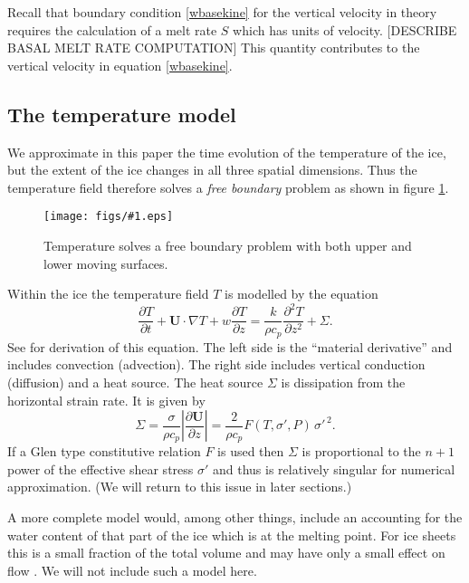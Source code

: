 \documentclass[12pt,final]{amsart}%
\theoremstyle{plain}
\theoremstyle{definition}
\theoremstyle{remark}
\newcommand{\regfigure}[2]{\texttt{[image: figs/\#1.eps]}}
\newcommand{\ddt}[1]{\ensuremath{\frac{\partial #1}{\partial t}}}
\newcommand{\ddz}[1]{\ensuremath{\frac{\partial #1}{\partial z}}}
\newcommand{\dddzdz}[1]{\ensuremath{\frac{\partial^2 #1}{\partial z^2}}}
\newcommand{\grad}{\nabla}
\newcommand{\bU}{{\mathbf{U}}}
\begin{document}
Recall that boundary condition \eqref{wbasekine} for the vertical velocity in theory requires the calculation of a melt rate $S$ which has units of velocity.  [DESCRIBE BASAL MELT RATE COMPUTATION]
This quantity contributes to the vertical velocity in equation \eqref{wbasekine}.


\subsection*{The temperature model}\label{ss:temp}   We approximate in this paper the time evolution of the temperature of the ice, but the extent of the ice changes in all three spatial dimensions.  Thus the temperature field therefore solves a \emph{free boundary} problem as shown in figure \ref{tempbdry}.

\begin{figure}[ht]
\vspace{-3mm}
\regfigure{tempbdryfig}{3}
\vspace{-6mm}
\caption{Temperature solves a free boundary problem with both upper and lower moving surfaces.}
\label{tempbdry}
\end{figure}

Within the ice the temperature field $T$ is modelled by the equation
\begin{equation}\label{Teqn}
\ddt{T} + \bU\cdot \grad T + w \ddz{T} = \frac{k}{\rho c_p} \dddzdz{T}+ \Sigma.
\end{equation}
See \citep{Fowler,Paterson,vanderVeen} for derivation of this equation.  The left side is the ``material derivative'' and includes convection (advection).  The right side includes vertical conduction (diffusion) and a heat source.  The heat source $\Sigma$ is dissipation from the horizontal strain rate.  It is given by \citep{Paterson}
    $$\Sigma = \frac{\sigma}{\rho c_p} \left|\ddz{\bU}\right| = \frac{2}{\rho c_p} F(T,\sigma',P) \, \sigma'^{\,2}.$$
If a Glen type constitutive relation $F$ is used then $\Sigma$ is proportional to the $n+1$ power of the effective shear stress $\sigma'$ and thus is relatively singular for numerical approximation.   (We will return to this issue in later sections.)

A more complete model would, among other things,  include an accounting for the water content of that part of the ice which is at the melting point.  For ice sheets this is a small fraction of the total volume and may have only a small effect on flow \citep{Greve}.  We will not include such a model here.
\end{document}
